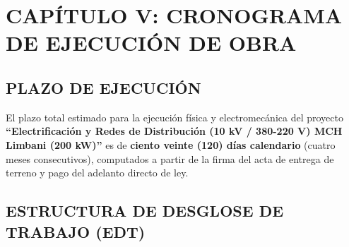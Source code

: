 \chapter*{CAPÍTULO V: CRONOGRAMA DE EJECUCIÓN DE OBRA}

\section{PLAZO DE EJECUCIÓN}

El plazo total estimado para la ejecución física y electromecánica del proyecto \textbf{``Electrificación y Redes de Distribución (10 kV / 380-220 V) MCH Limbani (200 kW)''} es de \textbf{ciento veinte (120) días calendario} (cuatro meses consecutivos), computados a partir de la firma del acta de entrega de terreno y pago del adelanto directo de ley.

\section{ESTRUCTURA DE DESGLOSE DE TRABAJO (EDT)}


